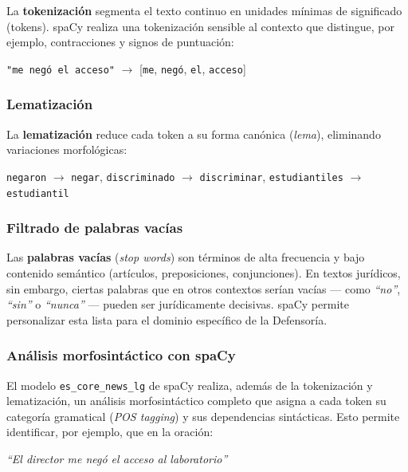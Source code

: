 La \textbf{tokenización} segmenta el texto continuo en unidades mínimas de
significado (tokens). spaCy realiza una tokenización sensible al contexto que
distingue, por ejemplo, contracciones y signos de puntuación:

\begin{center}
  \texttt{"me negó el acceso"} $\longrightarrow$
  [\texttt{me}, \texttt{negó}, \texttt{el}, \texttt{acceso}]
\end{center}

\subsubsection*{Lematización}

La \textbf{lematización} reduce cada token a su forma canónica (\textit{lema}),
eliminando variaciones morfológicas:

\begin{center}
  \texttt{negaron} $\to$ \texttt{negar}, \quad
  \texttt{discriminado} $\to$ \texttt{discriminar}, \quad
  \texttt{estudiantiles} $\to$ \texttt{estudiantil}
\end{center}

\subsubsection*{Filtrado de palabras vacías}

Las \textbf{palabras vacías} (\textit{stop words}) son términos de alta
frecuencia y bajo contenido semántico (artículos, preposiciones, conjunciones).
En textos jurídicos, sin embargo, ciertas palabras que en otros contextos serían
vacías — como \textit{``no''}, \textit{``sin''} o \textit{``nunca''} — pueden
ser jurídicamente decisivas. spaCy permite personalizar esta lista para el
dominio específico de la Defensoría.

\subsubsection*{Análisis morfosintáctico con spaCy}

El modelo \texttt{es\_core\_news\_lg} de spaCy realiza, además de la
tokenización y lematización, un análisis morfosintáctico completo que asigna a
cada token su categoría gramatical (\textit{POS tagging}) y sus dependencias
sintácticas. Esto permite identificar, por ejemplo, que en la oración:

\begin{center}
  \textit{``El director me negó el acceso al laboratorio''}
\end{center}

